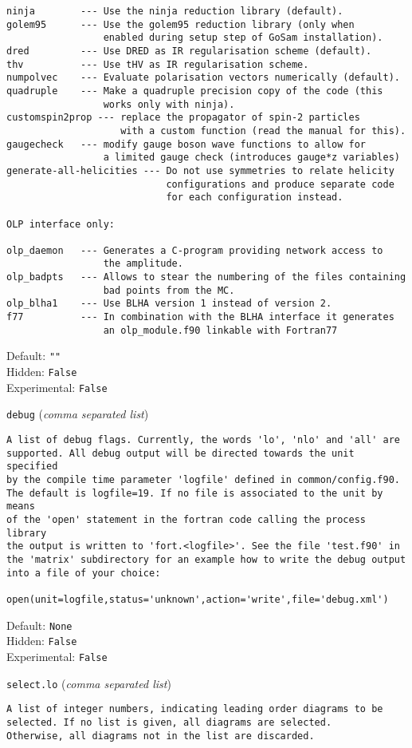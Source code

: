 \begin{basedescript}{\desclabelstyle{\pushlabel}}
\begin{verbatim}
ninja        --- Use the ninja reduction library (default).
golem95      --- Use the golem95 reduction library (only when
                 enabled during setup step of GoSam installation).
dred         --- Use DRED as IR regularisation scheme (default).
thv          --- Use tHV as IR regularisation scheme.
numpolvec    --- Evaluate polarisation vectors numerically (default).
quadruple    --- Make a quadruple precision copy of the code (this
                 works only with ninja).
customspin2prop --- replace the propagator of spin-2 particles
                    with a custom function (read the manual for this).
gaugecheck   --- modify gauge boson wave functions to allow for
                 a limited gauge check (introduces gauge*z variables)
generate-all-helicities --- Do not use symmetries to relate helicity
                            configurations and produce separate code
                            for each configuration instead.

OLP interface only:

olp_daemon   --- Generates a C-program providing network access to
                 the amplitude.
olp_badpts   --- Allows to stear the numbering of the files containing
                 bad points from the MC.
olp_blha1    --- Use BLHA version 1 instead of version 2.
f77          --- In combination with the BLHA interface it generates
                 an olp_module.f90 linkable with Fortran77
\end{verbatim}
Default: \verb|""|
\\Hidden: \verb|False|
\\Experimental: \verb|False|
\\\item[\colorbox{gray!30}{\texttt{debug}}] (\textit{comma separated list})
\begin{verbatim}
A list of debug flags. Currently, the words 'lo', 'nlo' and 'all' are
supported. All debug output will be directed towards the unit specified
by the compile time parameter 'logfile' defined in common/config.f90.
The default is logfile=19. If no file is associated to the unit by means
of the 'open' statement in the fortran code calling the process library
the output is written to 'fort.<logfile>'. See the file 'test.f90' in
the 'matrix' subdirectory for an example how to write the debug output
into a file of your choice:

open(unit=logfile,status='unknown',action='write',file='debug.xml')
\end{verbatim}
Default: \verb|None|
\\Hidden: \verb|False|
\\Experimental: \verb|False|
\\\item[\colorbox{gray!30}{\texttt{select.lo}}] (\textit{comma separated list})
\begin{verbatim}
A list of integer numbers, indicating leading order diagrams to be
selected. If no list is given, all diagrams are selected.
Otherwise, all diagrams not in the list are discarded.


\end{verbatim}
\end{basedescript}
